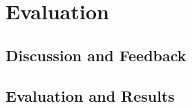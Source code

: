 \section{Evaluation}\label{sec:evaluation}
\subsection{Discussion and Feedback}\label{subsec:feedback}
\subsection{Evaluation and Results}\label{subsec:results}  


